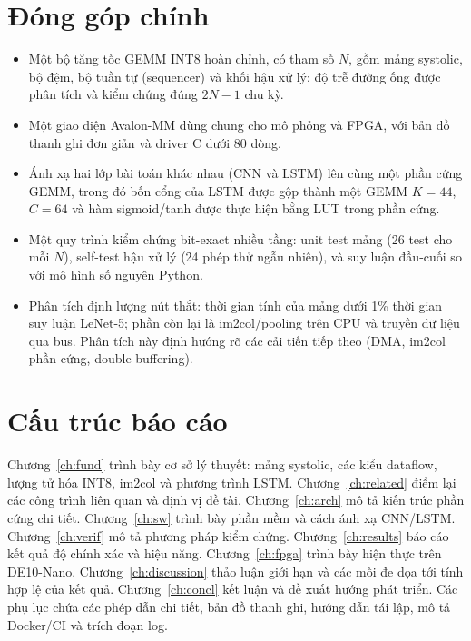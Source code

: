 \section{Đóng góp chính}
\begin{itemize}
  \item Một bộ tăng tốc GEMM INT8 hoàn chỉnh, có tham số $N$, gồm mảng systolic, bộ đệm, bộ tuần tự (sequencer) và khối hậu xử lý; độ trễ đường ống được phân tích và kiểm chứng đúng $2N-1$ chu kỳ.
  \item Một giao diện Avalon-MM dùng chung cho mô phỏng và FPGA, với bản đồ thanh ghi đơn giản và driver C dưới 80 dòng.
  \item Ánh xạ hai lớp bài toán khác nhau (CNN và LSTM) lên cùng một phần cứng GEMM, trong đó bốn cổng của LSTM được gộp thành một GEMM $K=44$, $C=64$ và hàm sigmoid/tanh được thực hiện bằng LUT trong phần cứng.
  \item Một quy trình kiểm chứng bit-exact nhiều tầng: unit test mảng (26 test cho mỗi $N$), self-test hậu xử lý (24 phép thử ngẫu nhiên), và suy luận đầu-cuối so với mô hình số nguyên Python.
  \item Phân tích định lượng nút thắt: thời gian tính của mảng dưới 1\% thời gian suy luận LeNet-5; phần còn lại là im2col/pooling trên CPU và truyền dữ liệu qua bus. Phân tích này định hướng rõ các cải tiến tiếp theo (DMA, im2col phần cứng, double buffering).
\end{itemize}

\section{Cấu trúc báo cáo}
Chương~\ref{ch:fund} trình bày cơ sở lý thuyết: mảng systolic, các kiểu dataflow, lượng tử hóa INT8, im2col và phương trình LSTM. Chương~\ref{ch:related} điểm lại các công trình liên quan và định vị đề tài. Chương~\ref{ch:arch} mô tả kiến trúc phần cứng chi tiết. Chương~\ref{ch:sw} trình bày phần mềm và cách ánh xạ CNN/LSTM. Chương~\ref{ch:verif} mô tả phương pháp kiểm chứng. Chương~\ref{ch:results} báo cáo kết quả độ chính xác và hiệu năng. Chương~\ref{ch:fpga} trình bày hiện thực trên DE10-Nano. Chương~\ref{ch:discussion} thảo luận giới hạn và các mối đe dọa tới tính hợp lệ của kết quả. Chương~\ref{ch:concl} kết luận và đề xuất hướng phát triển. Các phụ lục chứa các phép dẫn chi tiết, bản đồ thanh ghi, hướng dẫn tái lập, mô tả Docker/CI và trích đoạn log.
